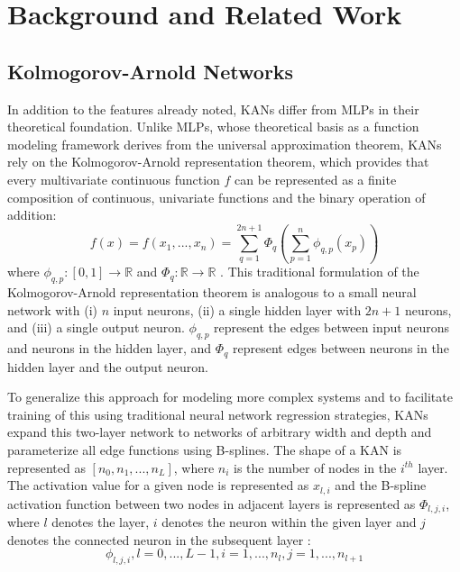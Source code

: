 \section{Background and Related Work}
\subsection{Kolmogorov-Arnold Networks}
In addition to the features already noted, KANs differ from MLPs in their theoretical foundation.  Unlike MLPs, whose theoretical basis as a function modeling framework derives from the universal approximation theorem,  KANs rely on the Kolmogorov-Arnold representation theorem, which provides that every multivariate continuous function \(f\) can be represented as a finite composition of continuous, univariate functions and the binary operation of addition:
\begin{equation}
f(x) = f(x_1, ..., x_n) = \sum_{q=1}^{2n+1} \Phi_q (\sum_{p=1}^n \phi_{q,p} (x_p))
\end{equation}
where \(\phi_{q,p} : [0,1] \rightarrow \mathbb{R}\) and \(\Phi_q : \mathbb{R} \rightarrow \mathbb{R}\) \cite{kolmogorov1957, liu2024}. 
This traditional formulation of the Kolmogorov-Arnold representation theorem is analogous to a small neural network with (i) \(n\) input neurons, (ii) a single hidden layer with \(2n+1\) neurons, and (iii) a single output neuron.  \(\phi_{q,p}\) represent the edges between input neurons and neurons in the hidden layer, and \(\Phi_q\) represent edges between neurons in the hidden layer and the output neuron.

To generalize this approach for modeling more complex systems and to facilitate training of this using traditional neural network regression strategies, KANs expand this two-layer network to networks of arbitrary width and depth and parameterize all edge functions using B-splines.  The shape of a KAN is represented as \([n_0, n_1, ..., n_L]\), where \(n_i\) is the number of nodes in the \(i^{th}\) layer.  The activation value for a given node is represented as \(x_{l,i}\) and the B-spline activation function between two nodes in adjacent layers is represented as \(\Phi_{l, j, i}\), where \(l\) denotes the layer, \(i\) denotes the neuron within the given layer and \(j\) denotes the connected neuron in the subsequent layer \cite{liu2024}:
\begin{equation}
\phi_{l,j,i}, l=0, ..., L-1, i=1, ..., n_l, j=1, ..., n_{l+1}
\end{equation}

